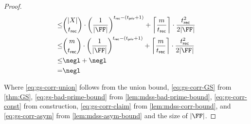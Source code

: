 \begin{proof}
\begin{align}
		\leq & \binom{|\mdssPointSet|}{\mdssRecThr} \cdot \mdssFieldBound + \mdssBPB                                                                                                                                                                  \label{eq:gs-corr-claim} \\
		\leq & \binom{\mdssMaxShares}{\mdssRecThr} \cdot \mdssFieldBound + \mdssBPB \label{eq:mdss-corr-last-before-negl}                                                                                                                                                                                            \\
		\leq & \negl + \negl \label{eq:gs-corr-asym} \\ 
        = & \negl
	\end{align}

	Where \ref{eq:gs-corr-union} follows from the union bound, \ref{eq:gs-corr-GS} from \cref{thm:GS}, \ref{eq:gs-bad-prime-bound} from \cref{lem:mdss-bad-prime-bound}, \ref{eq:gs-corr-const} from construction, \ref{eq:gs-corr-claim} from \cref{lem:mdss-corr-bound}, and \ref{eq:gs-corr-asym} from \cref{lem:mdss-asym-bound} and the size of $|\FF|$.
\end{proof}
